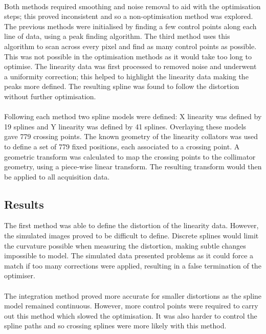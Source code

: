 \paragraph{}
Both methods required smoothing and noise removal to aid with the optimisation steps; this proved inconsistent and so a non-optimisation method was explored. The previous methods were initialised by finding a few control points along each line of data, using a peak finding algorithm. The third method uses this algorithm to scan across every pixel and find as many control points as possible. This was not possible in the optimisation methods as it would take too long to optimise. The linearity data was first processed to removed noise and underwent a uniformity correction; this helped to highlight the linearity data making the peaks more defined. The resulting spline was found to follow the distortion without further optimisation. 
\paragraph{}
Following each method two spline models were defined: X linearity was defined by 19 splines and Y linearity was defined by 41 splines. Overlaying these models gave 779 crossing points. The known geometry of the linearity collators was used to define a set of 779 fixed positions, each associated to a crossing point. A geometric transform was calculated to map the crossing points to the collimator geometry, using a piece-wise linear transform. The resulting transform would then be applied to all acquisition data.

\subsection{Results}
The first method was able to define the distortion of the linearity data. However, the simulated images proved to be difficult to define. Discrete splines would limit the curvature possible when measuring the distortion, making subtle changes impossible to model. The simulated data presented problems as it could force a match if too many corrections were applied, resulting in a false termination of the optimiser.
\paragraph{}
The integration method proved more accurate for smaller distortions as the spline model remained continuous. However, more control points were required to carry out this method which slowed the optimisation. It was also harder to control the spline paths and so crossing splines were more likely with this method. 
